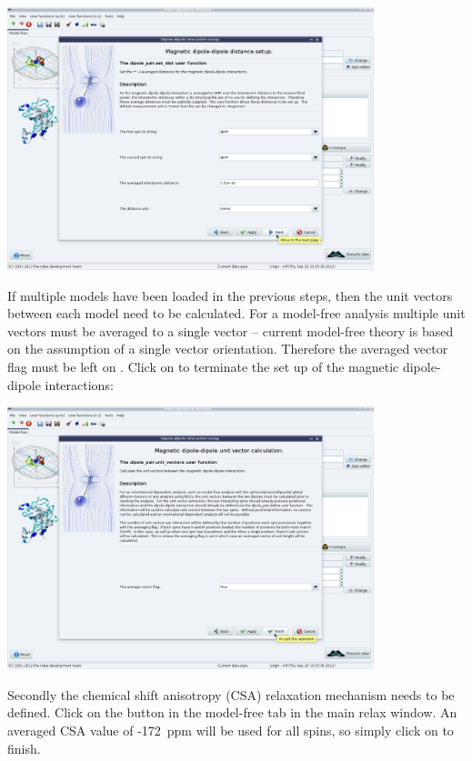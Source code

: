 \begin{htmlonly}
\begin{htmlonly}
\begin{minipage}[h]{\linewidth}
\centerline{\includegraphics[width=0.8\textwidth, bb=14 14 1415 1019]{graphics/screenshots/mf_analysis/dipole_wizard_distance}}
\end{minipage}

If multiple models have been loaded in the previous steps, then the unit vectors between each model need to be calculated.  For a model-free analysis multiple unit vectors must be averaged to a single vector -- current model-free theory is based on the assumption of a single vector orientation.  Therefore the averaged vector flag must be left on .  Click on  to terminate the set up of the magnetic dipole-dipole interactions:

\begin{minipage}[h]{\linewidth}
\centerline{\includegraphics[width=0.8\textwidth, bb=14 14 1415 1019]{graphics/screenshots/mf_analysis/dipole_wizard_unit_vector}}
\end{minipage}

Secondly the chemical shift anisotropy (CSA) relaxation mechanism needs to be defined.  Click on the  button in the model-free tab in the main relax window.  An averaged CSA value of -172~ppm will be used for all spins, so simply click on  to finish.


\end{htmlonly}
\end{htmlonly}
